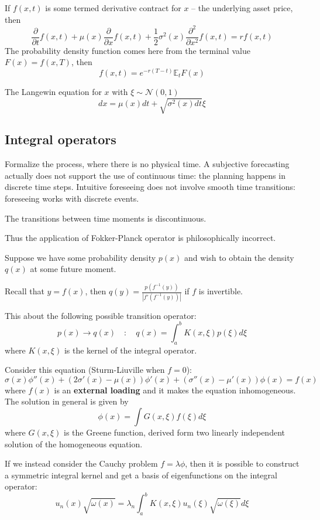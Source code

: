 \documentclass[a4paper]{article}
\newcommand{\brac}[1]{{\left ( #1 \right )}}
\newcommand{\abs}[1]{{\left | #1 \right |}}
\newcommand{\Ex}{\mathbb{E}}
\begin{document}
If $f(x,t)$ is some termed derivative contract for $x$ -- the underlying asset price, then 
\[\frac{\partial}{\partial t} f(x,t) + \mu(x) \frac{\partial}{\partial x}f(x,t) + \frac{1}{2}\sigma^2(x) \frac{\partial^2}{\partial x^2} f(x,t) = r f(x,t)\] 
The probability density function comes here from the terminal value $F(x) = f(x,T)$, then \[f(x,t) = e^{-r(T-t)}\Ex_t F(x)\]

The Langewin equation for $x$ with $\xi\sim \mathcal{N}(0,1)$
\[dx  = \mu(x) dt + \sqrt{\sigma^2(x)dt}\xi\]


\subsection{Integral operators} %
\label{sub:integral_operators}

Formalize the process, where there is no physical time. A subjective forecasting actually does not support the use of continuous time: the planning happens in discrete time steps. Intuitive foreseeing does not involve smooth time transitions: foreseeing works with discrete events.

The transitions between time moments is discontinuous.

Thus the application of Fokker-Planck operator is philosophically incorrect.

Suppose we have some probability density $p(x)$ and wish to obtain the density $q(x)$ at some future moment.

Recall that $y=f(x)$, then $q(y) = \frac{p\brac{f^{-1}(y)}}{\abs{f'\brac{f^{-1}(y)}}}$ if $f$ is invertible.

This about the following possible transition operator:
\[p(x)\to q(x)\quad : \quad q(x) = \int_a^b K(x,\xi) p(\xi) d\xi\]
where $K(x,\xi)$ is the kernel of the integral operator. 

Consider this equation (Sturm-Liuville when $f = 0$):
\[\sigma(x) \phi''(x) + \brac{2\sigma'(x) - \mu(x)} \phi'(x) + \brac{\sigma''(x) - \mu'(x) } \phi(x) = f(x)\]
where $f(x)$ is an \textbf{external loading} and it makes the equation inhomogeneous. The solution in general is given by
\[\phi(x) = \int G(x,\xi) f(\xi) d\xi\]
where $G(x,\xi)$ is the Greene function, derived form two linearly independent solution of the homogeneous equation.

If we instead consider the Cauchy problem $f=\lambda \phi$, then it is possible to construct a symmetric integral kernel and get a basis of eigenfunctions on the integral operator:
\[u_n(x)\sqrt{\omega(x)} = \lambda_n \int_a^b K(x,\xi) u_n(\xi)\sqrt{\omega(\xi)} d\xi\]
\end{document}

